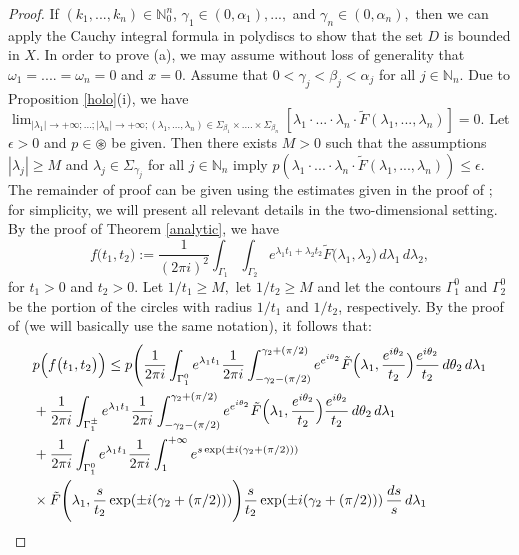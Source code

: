 \documentclass{amsart}
\theoremstyle{definition}
\theoremstyle{remark}
\numberwithin{equation}{section}
\begin{document}
\begin{proof}
If $(k_{1},...,k_{n})\in {\mathbb N}_{0}^{n}$, $\gamma_{1}\in (0,\alpha_{1}), ...,$ and $ \gamma_{n}\in (0,\alpha_{n}),$ then we can apply the Cauchy integral formula in polydiscs to show that the set $D$  is bounded in $X.$ In order to prove (a), we may assume without loss of generality that $\omega_{1}=....=\omega_{n}=0$ and $x=0.$ Assume that $0<\gamma_{j}<\beta_{j}<\alpha_{j}
$ for all $j\in {\mathbb N}_{n}.$ Due to Proposition \ref{holo}(i), we have 
$\lim_{|\lambda_{1}|\rightarrow +\infty;...;|\lambda_{n}|\rightarrow +\infty; (\lambda_{1},...,\lambda_{n})\in \Sigma_{\beta_{1}}\times .... \times \Sigma_{\beta_{n}}}[\lambda_{1}\cdot...\cdot \lambda_{n}\cdot \tilde{F}(\lambda_{1},...,\lambda_{n})]=0.$ Let $\epsilon>0$ and $p\in \circledast$ be given. Then there exists $M>0$ such that the assumptions $|\lambda_{j}|\geq M$ and $\lambda_{j}\in \Sigma_{\gamma_{j}}$ for all $j\in {\mathbb N}_{n}$ imply $p(\lambda_{1}\cdot...\cdot \lambda_{n}\cdot \tilde{F}(\lambda_{1},...,\lambda_{n}))\leq \epsilon.$ The remainder of proof can be given using the estimates given in the proof of \cite[Theorem 2.6.4, p. 88]{a43}; for simplicity, we will present all relevant details in the two-dimensional setting. By the proof of Theorem \ref{analytic}, we have
$$
f\bigl(t_{1},t_{2}\bigr):=\frac{1}{(2\pi i)^{2}}\int_{\Gamma_{1}} \int_{\Gamma_{2}}e^{\lambda_{1} t_{1}+ \lambda_{2}t_{2}}\tilde{F}\bigl(\lambda_{1}, \lambda_{2}\bigr)\, d\lambda_{1}  \, d\lambda_{2},
$$
for $t_{1}>0 $ and $t_{2}>0.$ Let $1/t_{1}\geq M,$ let $1/t_{2}\geq M$ and let the contours $\Gamma_{1}^{0}$ and $\Gamma_{2}^{0}$ be the portion of the circles with radius $1/t_{1}$ and $1/t_{2}$, respectively. By the proof of \cite[Theorem 2.6.4, p. 88]{a43} (we will basically use the same notation), it follows that:
\begin{align*}
& p\Bigl(f\bigl(t_{1},t_{2}\bigr) \Bigr)\leq p\Biggl(\frac{1}{2\pi i}\int_{\Gamma_{1}^{0}}e^{\lambda_{1}t_{1}}\frac{1}{2\pi i}\int_{-\gamma_{2}-(\pi/2)}^{\gamma_{2}+(\pi/2)}e^{e^{i\theta_{2}}}\tilde{F}\Bigl(\lambda_{1},\frac{e^{i\theta_{2}}}{t_{2}} \Bigr)\frac{e^{i\theta_{2}}}{t_{2}}\, d\theta_{2}\, d\lambda_{1}
\\& +\frac{1}{2\pi i}\int_{\Gamma_{1}^{\pm}}e^{\lambda_{1}t_{1}}\frac{1}{2\pi i}\int_{-\gamma_{2}-(\pi/2)}^{\gamma_{2}+(\pi/2)}e^{e^{i\theta_{2}}}\tilde{F}\Bigl(\lambda_{1},\frac{e^{i\theta_{2}}}{t_{2}} \Bigr)\frac{e^{i\theta_{2}}}{t_{2}}\, d\theta_{2}\, d\lambda_{1}
\\& +\frac{1}{2\pi i}\int_{\Gamma_{1}^{0}}e^{\lambda_{1}t_{1}}\frac{1}{2\pi i}\int_{1}^{+\infty}e^{s\exp(\pm i (\gamma_{2}+(\pi/2)))}\\& \times \tilde{F}\Biggl( \lambda_{1},\frac{s}{t_{2}}\exp(\pm i (\gamma_{2}+(\pi/2)))\Biggr)\frac{s}{t_{2}}\exp(\pm i (\gamma_{2}+(\pi/2)))\, \frac{ds}{s}\, d\lambda_{1}

\end{align*}
\end{proof}
\end{document}
